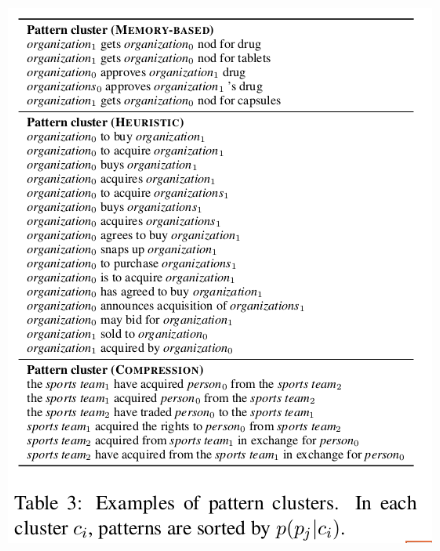 \documentclass[xcolor={table}]{beamer}
\begin{document}
\begin{frame}{\cite{pighin2014modelling}}
\begin{figure}[h]
\centering
\includegraphics[scale=.3]{images/table3-pighin14} \\
\end{figure}
\end{frame}
\end{document}
